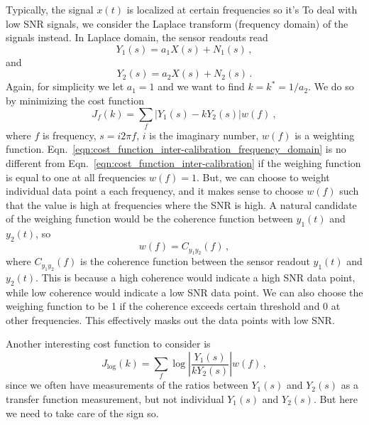 Typically, the signal $x(t)$ is localized at certain frequencies so it's 
To deal with low SNR signals, we consider the Laplace transform (frequency domain) of the signals instead.
In Laplace domain, the sensor readouts read
\begin{equation}
	Y_1(s) = a_1X(s) + N_1(s)\,,
\end{equation}
and
\begin{equation}
	Y_2(s) = a_2X(s) + N_2(s)\,.
\end{equation}
Again, for simplicity we let $a_1 = 1$ and we want to find $k=k^*=1/a_2$.
We do so by minimizing the cost function
\begin{equation}
	\boxed{
		J_f (k) = \sum_{f} \left\lvert Y_1(s) - kY_2(s)\right\rvert w(f)
	}\ ,
	\label{eqn:cost_function_inter-calibration_frequency_domain}
\end{equation}
where $f$ is frequency, $s=i2\pi f$, $i$ is the imaginary number, $w(f)$ is a weighting function.
Eqn.~\eqref{eqn:cost_function_inter-calibration_frequency_domain} is no different from Eqn.~\eqref{eqn:cost_function_inter-calibration} if the weighing function is equal to one at all frequencies $w(f)=1$.
But, we can choose to weight individual data point a each frequency, and it makes sense to choose $w(f)$ such that the value is high at frequencies where the SNR is high.
A natural candidate of the weighing function would be the coherence function between $y_1(t)$ and $y_2(t)$, so
\begin{equation}
	\boxed{
		w(f) = C_{y_1y_2}(f)\,,
}
\end{equation}
 where $C_{y_1y_2}(f)$ is the coherence function between the sensor readout $y_1(t)$ and $y_2(t)$.
 This is because a high coherence would indicate a high SNR data point, while low coherence would indicate a low SNR data point.
 We can also choose the weighing function to be 1 if the coherence exceeds certain threshold and 0 at other frequencies.
 This effectively masks out the data points with low SNR.
 
Another interesting cost function to consider is
\begin{equation}
	J_\mathrm{log} (k) = \sum_f \log\left\lvert \frac{Y_1(s)}{kY_2(s)} \right\rvert w(f)\,,
\end{equation}
since we often have measurements of the ratios between $Y_1(s)$ and $Y_2(s)$ as a transfer function measurement, but not individual $Y_1(s)$ and $Y_2(s)$.
But here we need to take care of the sign so.





